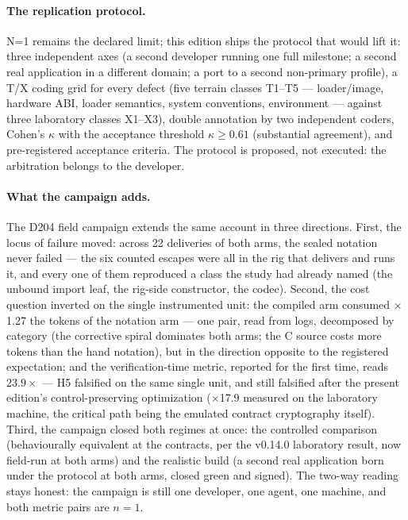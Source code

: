 \documentclass[11pt,a4paper]{article}
\begin{document}
\paragraph{The replication protocol.} N=1 remains the declared limit;
this edition ships the protocol that would lift it: three independent
axes (a second developer running one full milestone; a second real
application in a different domain; a port to a second non-primary
profile), a T/X coding grid for every defect (five terrain classes T1--T5
--- loader/image, hardware ABI, loader semantics, system conventions,
environment --- against three laboratory classes X1--X3), double
annotation by two independent coders, Cohen's $\kappa$ with the
acceptance threshold $\kappa \ge 0.61$ (substantial agreement), and
pre-registered acceptance criteria. The protocol is proposed, not
executed: the arbitration belongs to the developer.

\paragraph{What the campaign adds.}
The D204 field campaign extends the same account in three directions.
First, the locus of failure moved: across 22 deliveries of both arms,
the sealed notation never failed --- the six counted escapes were all
in the rig that delivers and runs it, and every one of them reproduced
a class the study had already named (the unbound import leaf, the
rig-side constructor, the codec). Second, the cost question inverted
on the single instrumented unit: the compiled arm consumed
$\times$1.27 the tokens of the notation arm --- one pair, read from
logs, decomposed by category (the corrective spiral dominates both
arms; the C source costs more tokens than the hand notation), but in
the direction opposite to the registered expectation;
and the verification-time metric, reported for the first time, reads
$23.9\times$ --- H5 falsified on the same single unit, and still
falsified after the present edition's control-preserving optimization
($\times$17.9 measured on the laboratory machine, the critical path
being the emulated contract cryptography itself). Third, the
campaign closed both regimes at once: the controlled comparison
(behaviourally equivalent at the contracts, per the v0.14.0
laboratory result, now field-run at both arms) and the realistic
build (a second real application born under the protocol at both
arms, closed green and signed). The two-way reading stays honest: the
campaign is still one developer, one agent, one machine, and both
metric pairs are $n{=}1$.
\end{document}
